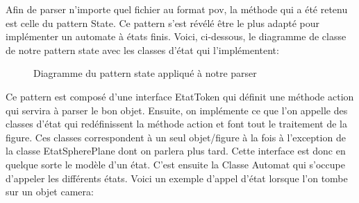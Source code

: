 \documentclass[../../Rapport RayTracer]{subfiles}
\begin{document}
Afin de parser n'importe quel fichier au format pov, la méthode qui a été retenu est celle du pattern State. Ce pattern s'est révélé être le plus adapté pour implémenter un automate à états finis. Voici, ci-dessous, le diagramme de classe de notre pattern state avec les classes d'état qui l'implémentent:

\begin{figure}[h!]
	
	\caption{Diagramme du pattern state appliqué à notre parser}
	\label{diagrammePatternState}
\end{figure}
\FloatBarrier

Ce pattern est composé d'une interface EtatToken qui définit une méthode action qui servira à parser le bon objet. Ensuite, on implémente ce que l'on appelle des classes d'état qui redéfinissent la méthode action et font tout le traitement de la figure. Ces classes correspondent à un seul objet/figure à la fois à l'exception de la classe EtatSpherePlane dont on parlera plus tard. Cette interface est donc en quelque sorte le modèle d'un état.
C'est ensuite la Classe Automat qui s'occupe d'appeler les différents états. Voici un exemple d'appel d'état lorsque l'on tombe sur un objet camera:
\end{document}

